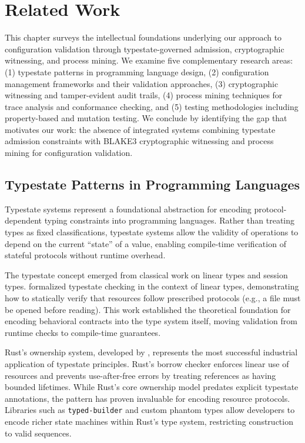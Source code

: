 \chapter{Related Work}

This chapter surveys the intellectual foundations underlying our approach to configuration validation through typestate-governed admission, cryptographic witnessing, and process mining. We examine five complementary research areas: (1) typestate patterns in programming language design, (2) configuration management frameworks and their validation approaches, (3) cryptographic witnessing and tamper-evident audit trails, (4) process mining techniques for trace analysis and conformance checking, and (5) testing methodologies including property-based and mutation testing. We conclude by identifying the gap that motivates our work: the absence of integrated systems combining typestate admission constraints with BLAKE3 cryptographic witnessing and process mining for configuration validation.

\section{Typestate Patterns in Programming Languages}

Typestate systems represent a foundational abstraction for encoding protocol-dependent typing constraints into programming languages. Rather than treating types as fixed classifications, typestate systems allow the validity of operations to depend on the current ``state'' of a value, enabling compile-time verification of stateful protocols without runtime overhead.

The typestate concept emerged from classical work on linear types and session types. \citet{Walker2005} formalized typestate checking in the context of linear types, demonstrating how to statically verify that resources follow prescribed protocols (e.g., a file must be opened before reading). This work established the theoretical foundation for encoding behavioral contracts into the type system itself, moving validation from runtime checks to compile-time guarantees.

Rust's ownership system, developed by \citet{Matsakis2014}, represents the most successful industrial application of typestate principles. Rust's borrow checker enforces linear use of resources and prevents use-after-free errors by treating references as having bounded lifetimes. While Rust's core ownership model predates explicit typestate annotations, the pattern has proven invaluable for encoding resource protocols. Libraries such as \texttt{typed-builder} and custom phantom types allow developers to encode richer state machines within Rust's type system, restricting construction to valid sequences.

